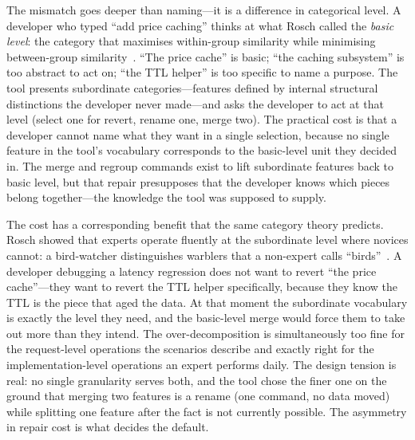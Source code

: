 The mismatch goes deeper than naming---it is a difference in categorical
level. A developer who typed ``add price caching'' thinks at what Rosch called
the \emph{basic level}: the category that maximises within-group similarity
while minimising between-group similarity~\cite{rosch1978}. ``The price cache'' is basic; ``the caching
subsystem'' is too abstract to act on; ``the TTL helper'' is too specific to
name a purpose. The tool presents subordinate categories---features defined by
internal structural distinctions the developer never made---and asks the
developer to act at that level (select one for revert, rename one, merge two).
The practical cost is that a developer cannot name what they want in a single
selection, because no single feature in the tool's vocabulary corresponds to
the basic-level unit they decided in. The merge and regroup commands exist to
lift subordinate features back to basic level, but that repair presupposes
that the developer knows which pieces belong together---the knowledge the tool
was supposed to supply.

The cost has a corresponding benefit that the same category theory predicts.
Rosch showed that experts operate fluently at the subordinate level where novices
cannot: a bird-watcher distinguishes warblers that a non-expert calls
``birds''~\cite{rosch1978}. A developer debugging a latency regression does not
want to revert ``the price cache''---they want to revert the TTL helper
specifically, because they know the TTL is the piece that aged the data. At that
moment the subordinate vocabulary is exactly the level they need, and the
basic-level merge would force them to take out more than they intend. The
over-decomposition is simultaneously too fine for the request-level operations the
scenarios describe and exactly right for the implementation-level operations an
expert performs daily. The design tension is real: no single granularity serves
both, and the tool chose the finer one on the ground that merging two features is
a rename (one command, no data moved) while splitting one feature after the
fact is not currently possible. The asymmetry in repair cost is what decides
the default.

\begin{figure}[t]
  \centering
  
  \caption{\FigSevenCaption}
  \Description{\FigSevenDescription}
  \label{fig:decomposition}
\end{figure}

